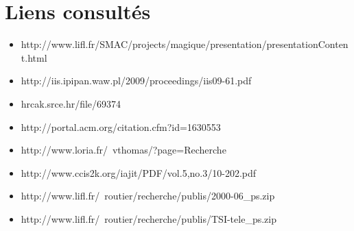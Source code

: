 \section{Liens consultés}

\begin{itemize}
  \item http://www.lifl.fr/SMAC/projects/magique/presentation/presentationContent.html
  \item http://iis.ipipan.waw.pl/2009/proceedings/iis09-61.pdf
  \item hrcak.srce.hr/file/69374
  \item http://portal.acm.org/citation.cfm?id=1630553
  \item http://www.loria.fr/~vthomas/?page=Recherche

  \item http://www.ccis2k.org/iajit/PDF/vol.5,no.3/10-202.pdf
  \item http://www.lifl.fr/~routier/recherche/publis/2000-06\_ps.zip
  \item http://www.lifl.fr/~routier/recherche/publis/TSI-tele\_ps.zip
\end{itemize}


